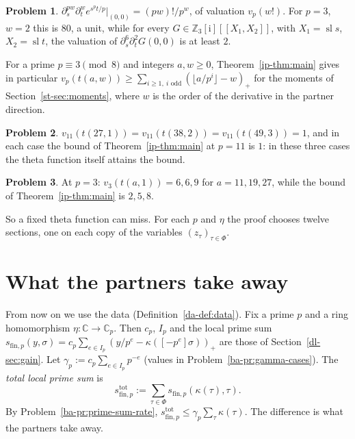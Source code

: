\documentclass[reqno]{amsart}
\theoremstyle{definition}
\newtheorem{problem}{Problem}[section]
\theoremstyle{plain}
\newcommand{\Z}{\mathbb{Z}}
\newcommand{\C}{\mathbb{C}}
\newcommand{\ii}{\mathrm{i}}
\newcommand{\sll}{\operatorname{sl}}
\newcommand{\sfp}{s_{\mathrm{fin},p}}
\newcommand{\stot}{s^{\mathrm{tot}}_{\mathrm{fin},p}}
\begin{document}
\begin{problem}\label{pr:coupling-exp}
\(\partial_s^{pw}\partial_t^{w} e^{s^pt/p}\big|_{(0,0)} = (pw)!/p^w\), of valuation \(v_p(w!)\).  For \(p = 3\), \(w = 2\) this is \(80\), a unit, while for every \(G \in \Z_3[\ii][[X_1, X_2]]\), with \(X_1 = \sll s\), \(X_2 = \sll t\), the valuation of \(\partial_s^6\partial_t^2 G(0,0)\) is at least \(2\).
\end{problem}

For a prime \(p \equiv 3 \pmod 8\) and integers \(a, w \ge 0\), Theorem~\ref{ip-thm:main} gives in particular \(v_p(t(a,w)) \ge \sum_{i \ge 1,\ i \text{ odd}} (\lfloor a/p^i\rfloor - w)_+\) for the moments of Section~\ref{st-sec:moments}, where \(w\) is the order of the derivative in the partner direction.

\begin{problem}\label{pr:one-partner}
\(v_{11}(t(27,1)) = v_{11}(t(38,2)) = v_{11}(t(49,3)) = 1\), and in each case the bound of Theorem~\ref{ip-thm:main} at \(p = 11\) is \(1\): in these three cases the theta function itself attains the bound.
\end{problem}

\begin{problem}\label{pr:not-attained}
At \(p = 3\): \(v_3(t(a,1)) = 6, 6, 9\) for \(a = 11, 19, 27\), while the bound of Theorem~\ref{ip-thm:main} is \(2, 5, 8\).
\end{problem}

So a fixed theta function can miss.  For each \(p\) and \(\eta\) the proof chooses twelve sections, one on each copy of the variables \((z_\tau)_{\tau\in\Phi}\).

\section{What the partners take away}\label{sec:partners}

From now on we use the data (Definition~\ref{da-def:data}).  Fix a prime \(p\) and a ring homomorphism \(\eta\colon\C\to\C_p\).  Then \(c_p\), \(I_p\) and the local prime sum \(\sfp(y,\sigma) = c_p \sum_{e \in I_p} (y/p^e - \kappa([-p^e]\sigma))_+\) are those of Section~\ref{dl-sec:gain}.  Let \(\gamma_p := c_p\sum_{e \in I_p} p^{-e}\) (values in Problem~\ref{ba-pr:gamma-cases}).  The \emph{total local prime sum} is
\begin{equation}\label{eq:stot}
  \stot := \sum_{\tau \in \Phi} \sfp(\kappa(\tau), \tau) .
\end{equation}
By Problem~\ref{ba-pr:prime-sum-rate}, \(\stot \le \gamma_p\sum_\tau \kappa(\tau)\).  The difference is what the partners take away.
\end{document}
